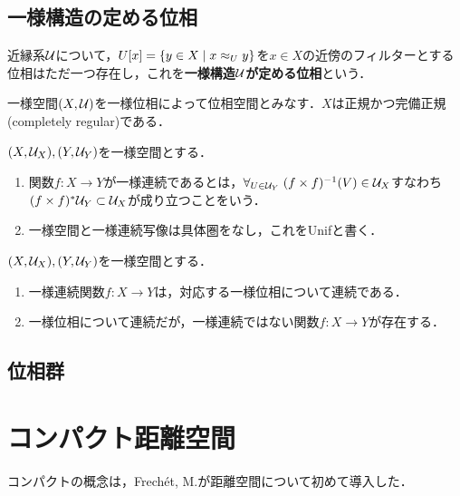 \documentclass[uplatex,dvipdfmx]{jsreport}
\begin{document}
\subsection{一様構造の定める位相}


\begin{definition}
    近縁系$\mathcal{U}$について，$U[x]=\left\{y\in X\mid x\approx_Uy\right\}$を$x\in X$の近傍のフィルターとする位相はただ一つ存在し，これを\textbf{一様構造$\mathcal{U}$が定める位相}という．
\end{definition}

\begin{proposition}
    一様空間$(X,\mathcal{U})$を一様位相によって位相空間とみなす．$X$は正規かつ完備正規(completely regular)である．
\end{proposition}

\begin{definition}
    $(X,\mathcal{U}_X),(Y,\mathcal{U}_Y)$を一様空間とする．
    \begin{enumerate}
        \item 関数$f:X\to Y$が一様連続であるとは，$\forall_{U\in\mathcal{U}_Y}\;(f\times f)^{-1}(V)\in\mathcal{U}_X$すなわち$(f\times f)^*\mathcal{U}_Y\subset\mathcal{U}_X$が成り立つことをいう．
        \item 一様空間と一様連続写像は具体圏をなし，これをUnifと書く．
    \end{enumerate}
\end{definition}

\begin{lemma}
    $(X,\mathcal{U}_X),(Y,\mathcal{U}_Y)$を一様空間とする．
    \begin{enumerate}
        \item 一様連続関数$f:X\to Y$は，対応する一様位相について連続である．
        \item 一様位相について連続だが，一様連続ではない関数$f:X\to Y$が存在する．
    \end{enumerate}
\end{lemma}

\subsection{位相群}

\section{コンパクト距離空間}

\begin{tcolorbox}[colframe=ForestGreen, colback=ForestGreen!10!white,breakable,colbacktitle=ForestGreen!40!white,coltitle=black,fonttitle=\bfseries\sffamily,
title=]
    コンパクトの概念は，Frechét, M.が距離空間について初めて導入した．
\end{tcolorbox}
\end{document}
